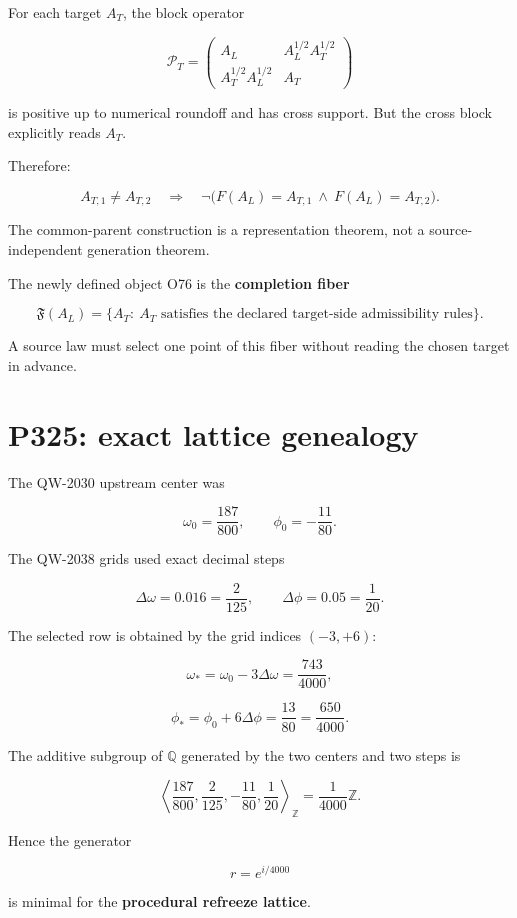 \documentclass[11pt,a4paper,openany]{report}
\begin{document}
For each target \(A_T\), the block operator

\[
\mathcal P_T=
\begin{pmatrix}
A_L & A_L^{1/2}A_T^{1/2}\\
A_T^{1/2}A_L^{1/2} & A_T
\end{pmatrix}
\]

is positive up to numerical roundoff and has cross support.  But the cross block explicitly reads \(A_T\).

Therefore:

\[
A_{T,1}\ne A_{T,2}
\quad\Longrightarrow\quad
\neg\bigl(
F(A_L)=A_{T,1}
\ \wedge\
F(A_L)=A_{T,2}
\bigr).
\]

The common-parent construction is a representation theorem, not a source-independent generation theorem.

The newly defined object O76 is the \textbf{completion fiber}

\[
\mathfrak F(A_L)=
\{A_T:\ A_T\text{ satisfies the declared target-side admissibility rules}\}.
\]

A source law must select one point of this fiber without reading the chosen target in advance.

\section{P325: exact lattice genealogy}

The QW-2030 upstream center was

\[
\omega_0=\frac{187}{800},
\qquad
\phi_0=-\frac{11}{80}.
\]

The QW-2038 grids used exact decimal steps

\[
\Delta\omega=0.016=\frac{2}{125},
\qquad
\Delta\phi=0.05=\frac1{20}.
\]

The selected row is obtained by the grid indices \((-3,+6)\):

\[
\omega_*=\omega_0-3\Delta\omega
=\frac{743}{4000},
\]

\[
\phi_*=\phi_0+6\Delta\phi
=\frac{13}{80}
=\frac{650}{4000}.
\]

The additive subgroup of \(\mathbb Q\) generated by the two centers and two steps is

\[
\left\langle
\frac{187}{800},
\frac{2}{125},
-\frac{11}{80},
\frac1{20}
\right\rangle_{\mathbb Z}
=
\frac1{4000}\mathbb Z.
\]

Hence the generator

\[
r=e^{i/4000}
\]

is minimal for the \textbf{procedural refreeze lattice}.
\end{document}
